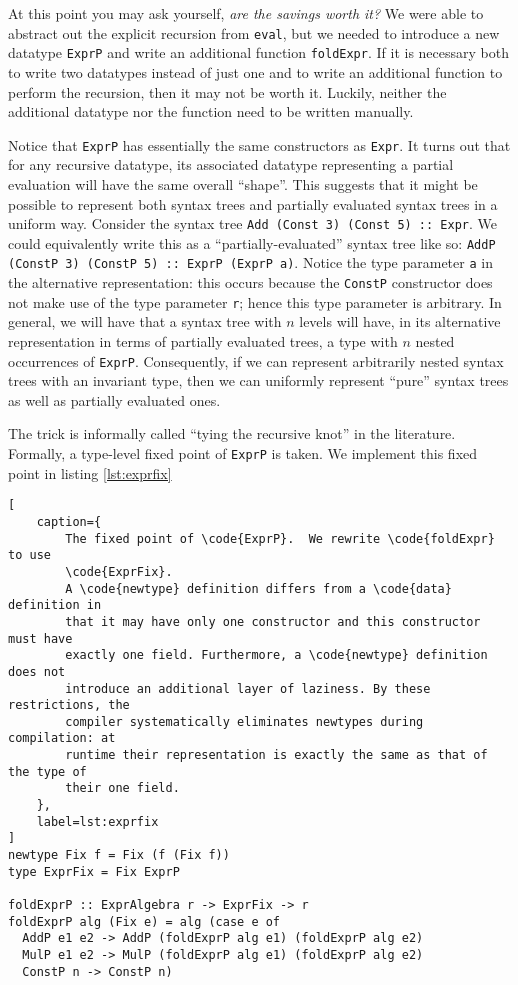\documentclass[letterpaper,11pt]{article}
\newcommand{\code}{\texttt}
\begin{document}
At this point you may ask yourself, \emph{are the savings worth it?} We were
able to abstract out the explicit recursion from \code{eval}, but we needed to
introduce a new datatype \code{ExprP} and write an additional function
\code{foldExpr}. If it is necessary both to write two datatypes instead of just
one and to write an additional function to perform the recursion, then it may
not be worth it. Luckily, neither the additional datatype nor the function need
to be written manually.

Notice that \code{ExprP} has essentially the same constructors as \code{Expr}.
It turns out that for any recursive datatype, its associated datatype
representing a partial evaluation will have the same overall ``shape''. This
suggests that it might be possible to represent both syntax trees and partially
evaluated syntax trees in a uniform way. Consider the syntax tree
\code{Add (Const 3) (Const 5) :: Expr}. We could equivalently write this as a
``partially-evaluated'' syntax tree like so:
\code{AddP (ConstP 3) (ConstP 5) :: ExprP (ExprP a)}. Notice the type parameter
\code{a} in the alternative representation: this occurs because the
\code{ConstP} constructor does not make use of the type parameter \code{r};
hence this type parameter is arbitrary. In general, we will have that a syntax
tree with $n$ levels will have, in its alternative representation in terms of
partially evaluated trees, a type with $n$ nested occurrences of \code{ExprP}.
Consequently, if we can represent arbitrarily nested syntax trees with an
invariant type, then we can uniformly represent ``pure'' syntax trees as well
as partially evaluated ones.

The trick is informally called ``tying the recursive knot'' in the literature.
Formally, a type-level fixed point of \code{ExprP} is taken. We implement this
fixed point in listing \ref{lst:exprfix}

\begin{lstlisting}[
    caption={
        The fixed point of \code{ExprP}.  We rewrite \code{foldExpr} to use
        \code{ExprFix}.
        A \code{newtype} definition differs from a \code{data} definition in
        that it may have only one constructor and this constructor must have
        exactly one field. Furthermore, a \code{newtype} definition does not
        introduce an additional layer of laziness. By these restrictions, the
        compiler systematically eliminates newtypes during compilation: at
        runtime their representation is exactly the same as that of the type of
        their one field.
    },
    label=lst:exprfix
]
newtype Fix f = Fix (f (Fix f))
type ExprFix = Fix ExprP

foldExprP :: ExprAlgebra r -> ExprFix -> r
foldExprP alg (Fix e) = alg (case e of
  AddP e1 e2 -> AddP (foldExprP alg e1) (foldExprP alg e2)
  MulP e1 e2 -> MulP (foldExprP alg e1) (foldExprP alg e2)
  ConstP n -> ConstP n)
\end{lstlisting}
\end{document}
